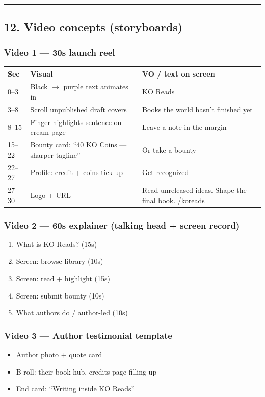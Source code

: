 \documentclass[11pt,a4paper]{report}
\begin{document}
\medskip\hrule\medskip

\subsection{12. Video concepts (storyboards)}

\subsubsection{Video 1 --- 30s launch reel}
\begin{longtable}{|l|l|l|}
\hline
Sec & Visual & VO / text on screen \\ \hline
0--3 & Black $\rightarrow$ purple text animates in & KO Reads \\ \hline
3--8 & Scroll unpublished draft covers & Books the world hasn’t finished yet \\ \hline
8--15 & Finger highlights sentence on cream page & Leave a note in the margin \\ \hline
15--22 & Bounty card: “40 KO Coins --- sharper tagline” & Or take a bounty \\ \hline
22--27 & Profile: credit + coins tick up & Get recognized \\ \hline
27--30 & Logo + URL & Read unreleased ideas. Shape the final book. /koreads \\
\hline
\end{longtable}


\subsubsection{Video 2 --- 60s explainer (talking head + screen record)}
\begin{enumerate}
  \item What is KO Reads? (15s)
  \item Screen: browse library (10s)
  \item Screen: read + highlight (15s)
  \item Screen: submit bounty (10s)
  \item What authors do / author-led (10s)
\end{enumerate}

\subsubsection{Video 3 --- Author testimonial template}
\begin{itemize}
  \item Author photo + quote card
  \item B-roll: their book hub, credits page filling up
  \item End card: “Writing inside KO Reads”
\end{itemize}
\end{document}
